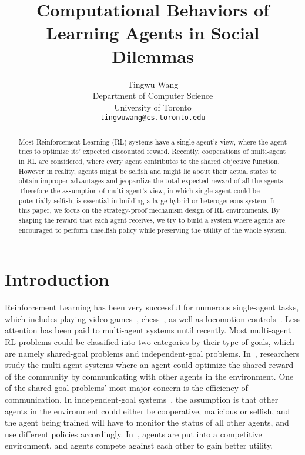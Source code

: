 \documentclass{article}
\title{Computational Behaviors of Learning Agents in Social Dilemmas}
\author{
  Tingwu Wang\\
  Department of Computer Science\\
  University of Toronto\\
  \texttt{tingwuwang@cs.toronto.edu} \\
}
\begin{document}
\maketitle
\begin{abstract}
    Most Reinforcement Learning (RL) systems have a single-agent's view,
    where the agent tries to optimize its' expected discounted reward.
    Recently, cooperations of multi-agent in RL are considered, where every agent contributes to the shared objective function.
    However in reality, agents might be selfish and might lie about their actual states to obtain improper advantages and jeopardize the total expected reward of all the agents.
    Therefore the assumption of multi-agent's view, in which single agent could be potentially selfish, is essential in building a large hybrid or heterogeneous system.
    In this paper, we focus on the strategy-proof mechanism design of RL environments.
    By shaping the reward that each agent receives,
    we try to build a system where agents are encouraged to perform unselfish policy while preserving the utility of the whole system.
\end{abstract}

\section{Introduction}
Reinforcement Learning has been very successful for numerous single-agent tasks, which includes playing video games~\cite{mnih2015human},
chess~\cite{silver2016mastering,silver2017mastering},
as well as locomotion controls~\cite{gae,trpo,ppo}.
Less attention has been paid to multi-agent systems until recently.
Most multi-agent RL problems could be classified into two categories by their type of goals,
which are namely shared-goal problems and independent-goal problems.
In~\cite{tuyls2018symmetric,foerster2017learning,sukhbaatar2016learning},
researchers study the multi-agent systems where an agent could optimize the shared reward of the community by communicating with other agents in the environment.
One of the shared-goal problems' most major concern is the efficiency of communication.
In independent-goal systems~\cite{lerer2017maintaining,leibo2017multi},
the assumption is that other agents in the environment could either be cooperative, malicious or selfish,
and the agent being trained will have to monitor the status of all other agents,
and use different policies accordingly. 
In~\cite{al2017continuous}, agents are put into a competitive environment, and agents compete against each other to gain better utility.
\end{document}
